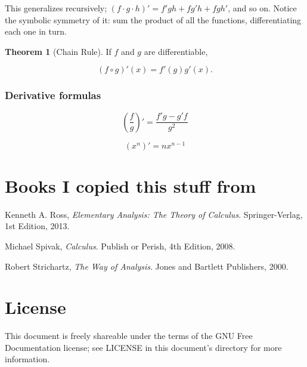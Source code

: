 \documentclass{article}
\theoremstyle{definition}
\newtheorem{theorem}{Theorem}
\begin{document}
This generalizes recursively; $(f \cdot g \cdot h)' = f'gh + fg'h + fgh'$, and
so on. Notice the symbolic symmetry of it: sum the product of all the functions,
differentiating each one in turn.

\begin{theorem}[Chain Rule]

If $f$ and $g$ are differentiable,

\begin{equation}
(f \circ g)'(x) = f'(g)g'(x).
\end{equation}


\end{theorem}

\subsubsection{Derivative formulas}

\begin{equation}
\left(\frac{f}{g}\right)' = \frac{f'g - g'f}{g^2}
\end{equation}

\begin{equation}
(x^n)' = nx^{n-1}
\end{equation}

\section{Books I copied this stuff from}

\begin{thebibliography}{9}

  Kenneth A. Ross,
  \emph{Elementary Analysis: The Theory of Calculus}.
  Springer-Verlag,
  1st Edition,
  2013.

  Michael Spivak,
  \emph{Calculus}.
  Publish or Perish,
  4th Edition,
  2008.

  Robert Strichartz,
  \emph{The Way of Analysis}.
  Jones and Bartlett Publishers,
  2000.
  
\end{thebibliography}

\section{License}

This document is freely shareable under the terms of the GNU Free Documentation
license; see LICENSE in this document's directory for more information.
\end{document}
